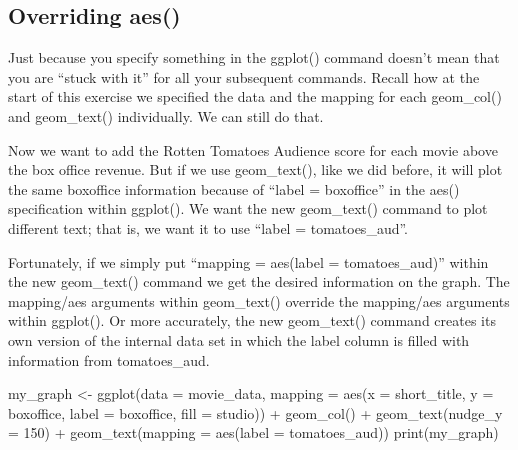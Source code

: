 \documentclass[
]{krantz}
\makeatletter
\newenvironment{Shaded}{\begin{snugshade}}{\end{snugshade}}
\newcommand{\AttributeTok}[1]{\textcolor[rgb]{0.61,0.61,0.61}{#1}}
\newcommand{\DecValTok}[1]{\textcolor[rgb]{0.06,0.06,0.06}{#1}}
\newcommand{\FunctionTok}[1]{\textcolor[rgb]{0,0,0}{#1}}
\newcommand{\NormalTok}[1]{#1}
\newcommand{\OtherTok}[1]{\textcolor[rgb]{0.37,0.37,0.37}{#1}}
\newcommand{\SpecialCharTok}[1]{\textcolor[rgb]{0,0,0}{#1}}
\newenvironment{kframe}{%
\medskip{}
\setlength{\fboxsep}{.8em}
 \def\at@end@of@kframe{}%
 \ifinner\ifhmode%
  \def\at@end@of@kframe{\end{minipage}}%
  \begin{minipage}{\columnwidth}%
 \fi\fi%
 \def\FrameCommand##1{\hskip\@totalleftmargin \hskip-\fboxsep
 \colorbox{shadecolor}{##1}\hskip-\fboxsep
     \hskip-\linewidth \hskip-\@totalleftmargin \hskip\columnwidth}%
 \MakeFramed {\advance\hsize-\width
   \@totalleftmargin\z@ \linewidth\hsize
   \@setminipage}}%
 {\par\unskip\endMakeFramed%
 \at@end@of@kframe}
\renewenvironment{Shaded}{\begin{kframe}}{\end{kframe}}
\makeatother
\begin{document}
\hypertarget{overriding-aes}{%
\subsection{Overriding aes()}\label{overriding-aes}}

Just because you specify something in the ggplot() command doesn't mean that you are ``stuck with it'' for all your subsequent commands. Recall how at the start of this exercise we specified the data and the mapping for each geom\_col() and geom\_text() individually. We can still do that.

Now we want to add the Rotten Tomatoes Audience score for each movie above the box office revenue. But if we use geom\_text(), like we did before, it will plot the same boxoffice information because of ``label = boxoffice'' in the aes() specification within ggplot(). We want the new geom\_text() command to plot different text; that is, we want it to use ``label = tomatoes\_aud''.

Fortunately, if we simply put ``mapping = aes(label = tomatoes\_aud)'' within the new geom\_text() command we get the desired information on the graph. The mapping/aes arguments within geom\_text() override the mapping/aes arguments within ggplot(). Or more accurately, the new geom\_text() command creates its own version of the internal data set in which the label column is filled with information from tomatoes\_aud.

\begin{Shaded}
\begin{Highlighting}[]
\NormalTok{my\_graph }\OtherTok{\textless{}{-}} \FunctionTok{ggplot}\NormalTok{(}\AttributeTok{data =}\NormalTok{ movie\_data,}
           \AttributeTok{mapping =} \FunctionTok{aes}\NormalTok{(}\AttributeTok{x =}\NormalTok{ short\_title,}
                         \AttributeTok{y =}\NormalTok{ boxoffice,}
                         \AttributeTok{label =}\NormalTok{ boxoffice, }
                         \AttributeTok{fill =}\NormalTok{ studio)) }\SpecialCharTok{+}
  \FunctionTok{geom\_col}\NormalTok{() }\SpecialCharTok{+}
  \FunctionTok{geom\_text}\NormalTok{(}\AttributeTok{nudge\_y =} \DecValTok{150}\NormalTok{)  }\SpecialCharTok{+}
  \FunctionTok{geom\_text}\NormalTok{(}\AttributeTok{mapping =} \FunctionTok{aes}\NormalTok{(}\AttributeTok{label =}\NormalTok{ tomatoes\_aud)) }
\FunctionTok{print}\NormalTok{(my\_graph)}
\end{Highlighting}
\end{Shaded}
\end{document}
